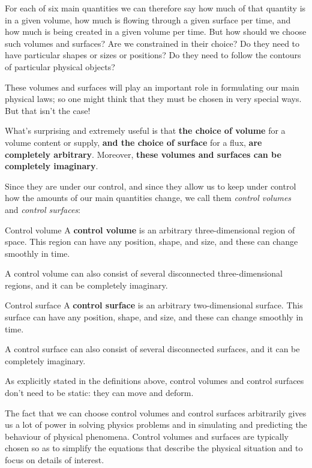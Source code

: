 \documentclass[a4paper,12pt,%
onecolumn,oneside,%
british%
]{memoir}
\renewcommand*{\|}[1][]{\nonscript\:#1\vert\nonscript\:\mathopen{}}
\begin{document}
For each of six main quantities we can therefore say how much of that quantity is in a given volume, how much is flowing through a given surface per time, and how much is being created in a given volume per time. But how should we choose such volumes and surfaces? Are we constrained in their choice? Do they need to have particular shapes or sizes or positions? Do they need to follow the contours of particular physical objects?

These volumes and surfaces will play an important role in formulating our main physical laws; so one might think that they must be chosen in very special ways. But that isn't the case!

What's surprising and extremely useful is that \textbf{the choice of volume} for a volume content or supply, \textbf{and the choice of surface} for a flux, \textbf{are completely arbitrary}. Moreover, \textbf{these volumes and surfaces can be completely imaginary}.

Since they are under our control, and since they allow us to keep under control how the amounts of our main quantities change, we call them \emph{control volumes} and \emph{control surfaces}:

\begin{definition}{Control volume}
  A \textbf{control volume} is an arbitrary three-dimensional region of space. This region can have any position, shape, and size, and these can change smoothly in time.

  \smallskip

  A control volume can also consist of several disconnected three-dimensional regions, and it can be completely imaginary.
\end{definition}

\begin{definition}{Control surface}
  A \textbf{control surface} is an arbitrary two-dimensional surface. This surface can have any position, shape, and size, and these can change smoothly in time.

  \smallskip

  A control surface can also consist of several disconnected surfaces, and it can be completely imaginary.
\end{definition}

As explicitly stated in the definitions above, control volumes and control surfaces don't need to be static: they can move and deform.

\medskip

The fact that we can choose control volumes and control surfaces arbitrarily gives us a lot of power in solving physics problems and in simulating and predicting the behaviour of physical phenomena. Control volumes and surfaces are typically chosen so as to simplify the equations that describe the physical situation and to focus on details of interest.
\end{document}

